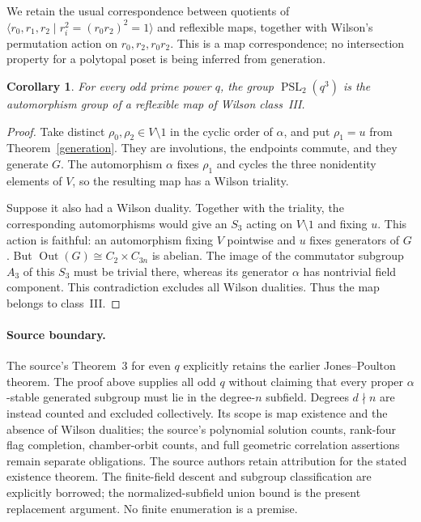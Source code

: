 \documentclass[11pt,a4paper]{article}
\newtheorem{corollary}[lemma]{Corollary}
\newcommand{\PSL}{\operatorname{PSL}}
\newcommand{\gen}[1]{\langle#1\rangle}
\begin{document}
We retain the usual correspondence between quotients of
$\gen{r_0,r_1,r_2\mid r_i^2=(r_0r_2)^2=1}$ and reflexible
maps, together with Wilson's permutation action on
$r_0,r_2,r_0r_2$. This is a map correspondence; no intersection
property for a polytopal poset is being inferred from generation.

\begin{corollary}
For every odd prime power $q$, the group $\PSL_2(q^3)$ is
the automorphism group of a reflexible map of Wilson class~III.
\end{corollary}
\begin{proof}
Take distinct $\rho_0,\rho_2\in V\setminus1$ in the cyclic
order of $\alpha$, and put $\rho_1=u$ from
Theorem~\ref{generation}. They are involutions, the endpoints
commute, and they generate $G$. The automorphism $\alpha$
fixes $\rho_1$ and cycles the three nonidentity elements of $V$,
so the resulting map has a Wilson triality.

Suppose it also had a Wilson duality. Together with the triality,
the corresponding automorphisms would give an $S_3$ acting on
$V\setminus1$ and fixing $u$. This action is faithful: an
automorphism fixing $V$ pointwise and $u$ fixes generators of $G$.
But $\operatorname{Out}(G)\cong C_2\times C_{3n}$ is abelian.
The image of the commutator subgroup $A_3$ of this $S_3$ must
be trivial there, whereas its generator $\alpha$ has nontrivial
field component. This contradiction excludes all Wilson dualities.
Thus the map belongs to class~III.
\end{proof}

\paragraph{Source boundary.}
The source's Theorem~3 for even $q$ explicitly retains the earlier
Jones--Poulton theorem. The proof above supplies all odd $q$ without
claiming that every proper $\alpha$-stable generated subgroup must
lie in the degree-$n$ subfield. Degrees $d\nmid n$ are instead
counted and excluded collectively. Its scope is map existence and
the absence of Wilson dualities; the source's polynomial solution
counts, rank-four flag completion, chamber-orbit counts, and full
geometric correlation assertions remain separate obligations.
The source authors retain attribution for the stated existence
theorem. The finite-field descent and subgroup classification are
explicitly borrowed; the normalized-subfield union bound is the
present replacement argument. No finite enumeration is a premise.
\end{document}
